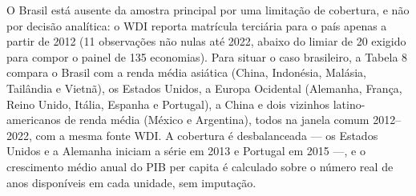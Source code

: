 \documentclass[12pt,a4paper]{article}
\begin{document}
O Brasil está ausente da amostra principal por uma limitação de cobertura, e não por decisão analítica: o WDI reporta matrícula terciária para o país apenas a partir de 2012 (11 observações não nulas até 2022, abaixo do limiar de 20 exigido para compor o painel de 135 economias). Para situar o caso brasileiro, a Tabela 8 compara o Brasil com a renda média asiática (China, Indonésia, Malásia, Tailândia e Vietnã), os Estados Unidos, a Europa Ocidental (Alemanha, França, Reino Unido, Itália, Espanha e Portugal), a China e dois vizinhos latino-americanos de renda média (México e Argentina), todos na janela comum 2012--2022, com a mesma fonte WDI. A cobertura é desbalanceada --- os Estados Unidos e a Alemanha iniciam a série em 2013 e Portugal em 2015 ---, e o crescimento médio anual do PIB per capita é calculado sobre o número real de anos disponíveis em cada unidade, sem imputação.

\begin{table}[htbp]
\centering
\caption{Caso brasileiro em perspectiva comparada (janela 2012--2022)}
\label{tab:brasil}
\small
{}
\par{}
\end{table}
\end{document}
